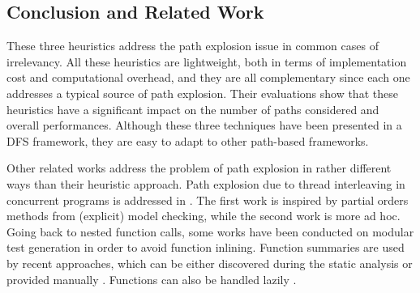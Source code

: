 \subsection{Conclusion and Related Work}
These three heuristics address the path explosion issue in common cases of irrelevancy. All these heuristics are lightweight, both in terms of implementation cost and computational overhead, and they are all complementary since each one addresses a typical source of path explosion.
Their evaluations show that these heuristics have a significant impact on the number of paths considered and overall performances. Although these three techniques have been presented in a DFS framework, they are easy to adapt to other path-based frameworks. 

Other related works address the problem of path explosion in rather different ways than their heuristic approach. Path explosion due to thread interleaving in concurrent programs is addressed in \cite{distribute, peephole}. The first work is inspired by partial orders methods from (explicit) model checking, while the second work is more ad hoc. Going back to nested function calls, some works have been conducted on modular test generation in order to avoid function inlining. Function summaries are used by recent approaches, which can be either discovered during the static analysis \cite{demand, compositional} or provided manually \cite{allpath}. Functions can also be handled lazily \cite{demand}.

